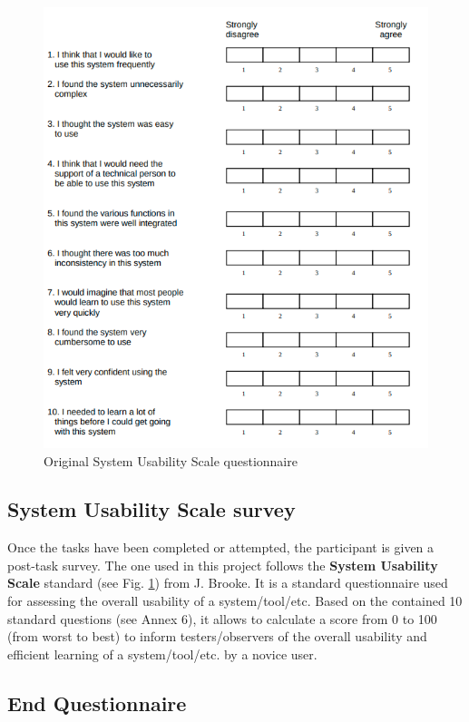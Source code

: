 \documentclass[twocolumn, letterpaper,13pt]{scrartcl}
\begin{document}
    \begin{figure}	\includegraphics[width=0.98\linewidth]{SUS.png}
    \caption{Original System Usability Scale questionnaire\label{fig:f}}
    \end{figure}

    \subsection{System Usability Scale survey}
    
    Once the tasks have been completed or attempted, the participant is given a post-task survey. The one used in this project follows the \textbf{System Usability Scale} standard (see Fig. \ref{fig:f}) from J. Brooke\cite{brook}. It is a standard questionnaire used for assessing the overall usability of a system/tool/etc. Based on the contained 10 standard questions (see Annex 6), it allows to calculate a score from 0 to 100 (from worst to best) to inform testers/observers of the overall usability and efficient learning of a system/tool/etc. by a novice user.
    
    \subsection{End Questionnaire}
    
\end{document}
